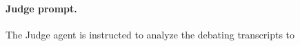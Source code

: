 \documentclass{article} %
\begin{document}
\clearpage
\paragraph{Judge prompt.}  The Judge agent is instructed to analyze the debating transcripts to 

\end{document}
